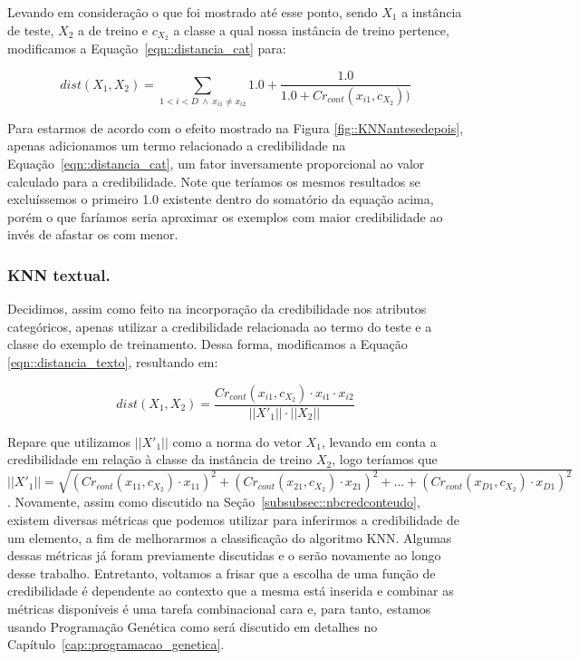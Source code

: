 Levando em consideração o que foi mostrado até esse ponto, sendo $X_1$ a instância de teste, $X_2$ a de treino e $c_{X_2}$ a classe a qual nossa instância de treino pertence, modificamos a Equação~\ref{eqn::distancia_cat} para:

\begin{equation} \label{eqn::distancia_cat_cred}
   dist(X_1, X_2) = \sum_{1 < i < D\ \wedge \ x_{i1} \neq x_{i2}} 1.0 + \frac{1.0}{1.0 + Cr_{cont}(x_{i1}, c_{X_2} ))}
\end{equation}

Para estarmos de acordo com o efeito mostrado na Figura \ref{fig::KNNantesedepois}, apenas adicionamos um termo relacionado a credibilidade na Equação~\ref{eqn::distancia_cat}, um fator inversamente proporcional ao valor calculado para a credibilidade. Note que teríamos os mesmos resultados se excluíssemos o primeiro 1.0 existente dentro do somatório da equação acima, porém o que faríamos seria aproximar os exemplos com maior credibilidade ao invés de afastar os com menor.

\subsubsection{\textsc{KNN} textual.}
\label{subsubsec::knntexto}

Decidimos, assim como feito na incorporação da credibilidade nos atributos categóricos, apenas utilizar a credibilidade relacionada ao termo do teste e a classe do exemplo de treinamento. Dessa forma, modificamos a Equação \ref{eqn::distancia_texto}, resultando em:

\begin{equation}\label{eqn::distancia_texto_cat}
    dist(X_1, X_2) = \frac{  Cr_{cont}(x_{i1}, c_{X_2}) \cdot x_{i1} \cdot x_{i2} }{ ||X'_1|| \cdot ||X_2|| }
\end{equation}

Repare que utilizamos $||X'_1||$ como a norma do vetor $X_1$, levando em conta a credibilidade em relação à classe da instância de treino $X_2$, logo teríamos que $||X'_1|| = \sqrt{ ( Cr_{cont}(x_{11}, c_{X_2}) \cdot x_{11} )^2 + ( Cr_{cont}(x_{21}, c_{X_2}) \cdot x_{21} )^2 +  ... +  ( Cr_{cont}(x_{D1}, c_{X_2}) \cdot  x_{D1} )^2}$.
Novamente, assim como discutido na Seção~\ref{subsubsec::nbcredconteudo}, existem diversas métricas que podemos utilizar para inferirmos a credibilidade de um elemento, a fim de melhorarmos a classificação do algoritmo \textsc{KNN}. Algumas dessas métricas já foram previamente discutidas e o serão novamente ao longo desse trabalho. Entretanto, voltamos a frisar que a escolha de uma função de credibilidade é dependente ao contexto que a mesma está inserida e combinar as métricas disponíveis é uma tarefa combinacional cara e, para tanto, estamos usando Programação Genética como será discutido em detalhes no Capítulo~\ref{cap::programacao_genetica}.

